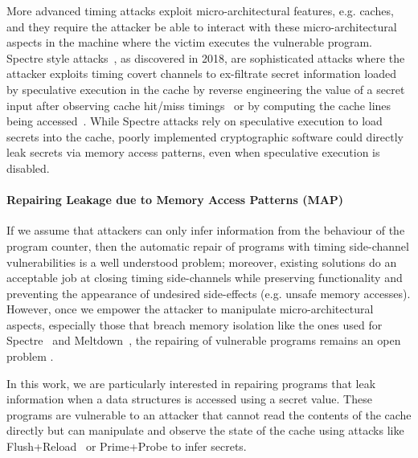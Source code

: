 More advanced timing attacks exploit micro-architectural features, e.g. caches, and they require the attacker be able to interact with these micro-architectural aspects in the machine where the victim executes the vulnerable program. Spectre style attacks~\cite{Spectre}, as discovered in 2018, are sophisticated attacks where the attacker exploits timing covert channels to ex-filtrate secret information loaded by speculative execution in the cache by reverse engineering the value of a secret input after observing cache hit/miss timings~\cite{timing-cache} or by computing the cache lines being accessed~\cite{prime-probe}. While Spectre attacks rely on speculative execution to load secrets into the cache, poorly implemented cryptographic software could directly leak secrets via memory access patterns, even when speculative execution is disabled.

\paragraph*{Repairing Leakage due to Memory Access Patterns (MAP)} 
If we assume that attackers can only infer information from the behaviour of the program counter, then the automatic repair of programs with timing side-channel vulnerabilities is a well understood problem; moreover, existing solutions \cite{SCEliminator,MSESC,Racoon} do an acceptable job at closing timing side-channels while preserving functionality and preventing the appearance of undesired side-effects (e.g. unsafe memory accesses). %
However, once we empower the attacker to manipulate micro-architectural aspects, especially those that breach memory isolation like the ones used for Spectre~\cite{Spectre} and Meltdown~\cite{Meltdown}, the repairing of vulnerable programs remains an open problem \cite{timing-channel-survey}. 

In this work, we are particularly interested in repairing programs that leak information when a data structures is accessed using a secret value. These programs are vulnerable to an attacker that cannot read the contents of the cache directly but can manipulate and observe the state of the cache using attacks like Flush+Reload~\cite{Flush+Reload} or Prime+Probe\cite{prime-probe} to infer secrets.


